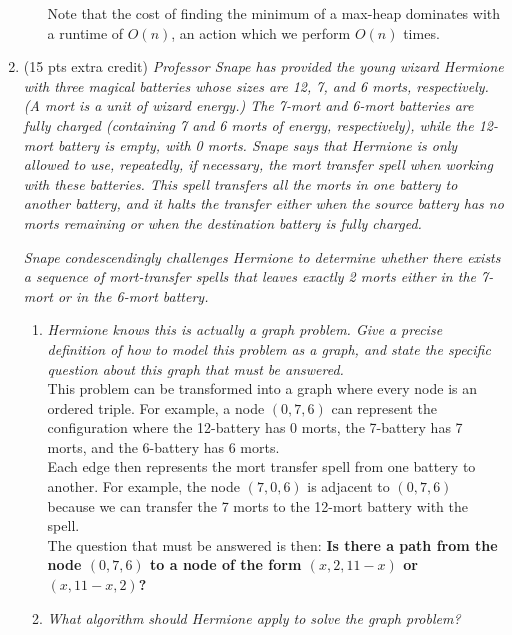 \documentclass[12pt]{article}
\begin{document}
\begin{enumerate}
\begin{enumerate}
    Note that the cost of finding the minimum of a max-heap dominates with a runtime of $O(n)$, an action which we perform $O(n)$ times.
    
	
	\end{enumerate}


    \newpage
	\item (15 pts extra credit) \textit{Professor Snape has provided the young wizard Hermione with three magical batteries whose sizes are 12, 7, and 6 
morts, respectively. (A \textit{mort} is a unit of wizard energy.) The 7-mort and 6-mort batteries are fully charged (containing 7 and 6 morts of energy, 
respectively), while the 12-mort battery is empty, with 0 morts. Snape says that Hermione is only allowed to use, repeatedly, if necessary, the \textit{mort 
transfer spell} when working with these batteries. This spell transfers all the morts in one battery to another battery, and it halts the transfer either when 
the source battery has no morts remaining or when the destination battery is fully charged.}
	
	\textit{Snape condescendingly challenges Hermione to determine whether there exists a sequence of mort-transfer spells that leaves exactly 2 morts 
either in the 7-mort or in the 6-mort battery.}
	\begin{enumerate}
	\item \textit{Hermione knows this is actually a graph problem. Give a precise definition of how to model this problem as a graph, and state the 
specific question about this graph that must be answered.}\\
	
	This problem can be transformed into a graph where every node is an ordered triple. For example, a node $(0,7,6)$ can represent the configuration 
where the 12-battery has 0 morts, the 7-battery has 7 morts, and the 6-battery has 6 morts.\\
	
	Each edge then represents the mort transfer spell from one battery to another. For example, the node $(7,0,6)$ is adjacent to $(0,7,6)$ because we can 
transfer the 7 morts to the 12-mort battery with the spell.\\
	
	The question that must be answered is then: \textbf{Is there a path from the node $(0,7,6)$ to a node of the form $(x,2,11-x)$ or $(x,11-x,2)$?}\\
	
	\item \textit{What algorithm should Hermione apply to solve the graph problem?}\\
	

\end{enumerate}
\end{enumerate}
\end{document}
